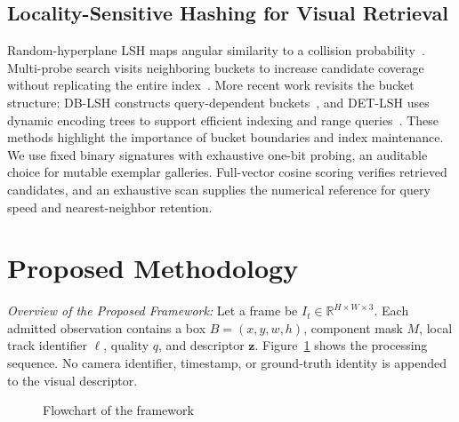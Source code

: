 \documentclass[conference]{IEEEtran}
\begin{document}
\subsection{Locality-Sensitive Hashing for Visual Retrieval}
Random-hyperplane LSH maps angular similarity to a collision probability~\cite{charikar2002}. Multi-probe search visits neighboring buckets to increase candidate coverage without replicating the entire index~\cite{lv2007multiprobe}. More recent work revisits the bucket structure: DB-LSH constructs query-dependent buckets~\cite{dblsh2022}, and DET-LSH uses dynamic encoding trees to support efficient indexing and range queries~\cite{detlsh2024}. These methods highlight the importance of bucket boundaries and index maintenance. We use fixed binary signatures with exhaustive one-bit probing, an auditable choice for mutable exemplar galleries. Full-vector cosine scoring verifies retrieved candidates, and an exhaustive scan supplies the numerical reference for query speed and nearest-neighbor retention.

\section{Proposed Methodology}
\noindent\textit{Overview of the Proposed Framework:}
Let a frame be $I_t\in\mathbb{R}^{H\times W\times3}$. Each admitted observation contains a box $B=(x,y,w,h)$, component mask $M$, local track identifier $\ell$, quality $q$, and descriptor $\mathbf z$. Figure~\ref{fig:pipeline} shows the processing sequence. No camera identifier, timestamp, or ground-truth identity is appended to the visual descriptor.

\begin{figure}[t]
\centering
{}
\caption{Flowchart of the framework}
\label{fig:pipeline}
\end{figure}
\end{document}
